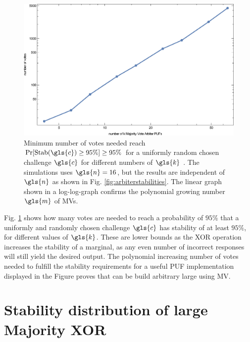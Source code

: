 \begin{figure}[ht]
\includegraphics[width=1.00\textwidth]{images/votes-stab-simulation.eps}
\caption{Minimum number of votes needed reach $\Pr[\protect\Stab(\gls{c}) \ge 95 \%] \ge 95 \%$ for a uniformly random chosen challenge $\gls{c}$ for different numbers of $\gls{k}$ \apufs. 
The simulations uses $\gls{n} = 16$, but the results are independent of $\gls{n}$ as shown in Fig. \ref{fig:arbiterstabilities}. 
The linear graph shown in a log-log-graph confirms the polynomial growing number $\gls{m}$ of \acp{MV}.} 
\label{fig:majorityvotegrowth}
\end{figure}

Fig. \ref{fig:majorityvotegrowth} shows how many votes are needed to reach a probability of $95 \%$ that a uniformly and randomly chosen challenge $\gls{c}$ has stability of at least $95 \%$, for different values of $\gls{k}$.
These are lower bounds as the \ac{XOR} operation increases the stability of a \xpuf marginal, as any even number of incorrect responses will still yield the desired output.
The polynomial increasing number of votes needed to fulfill the stability requirements for a useful PUF implementation displayed in the Figure proves that \xpufs can be build arbitrary large using \ac{MV}.


\section{Stability distribution of large Majority \acs{XOR} \apufs}

